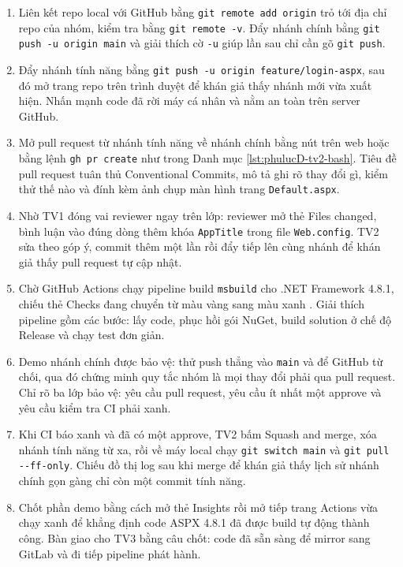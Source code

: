 \begin{enumerate}
\item Liên kết repo local với GitHub bằng \verb|git remote add origin| trỏ tới địa chỉ repo của nhóm, kiểm tra bằng \verb|git remote -v|.
Đẩy nhánh chính bằng \verb|git push -u origin main| và giải thích cờ \verb|-u| giúp lần sau chỉ cần gõ \verb|git push|.
\item Đẩy nhánh tính năng bằng \verb|git push -u origin feature/login-aspx|, sau đó mở trang repo trên trình duyệt để khán giả thấy nhánh mới vừa xuất hiện.
Nhấn mạnh code đã rời máy cá nhân và nằm an toàn trên server GitHub.
\item Mở pull request từ nhánh tính năng về nhánh chính bằng nút trên web hoặc bằng lệnh \verb|gh pr create| như trong Danh mục \ref{lst:phulucD-tv2-bash}.
Tiêu đề pull request tuân thủ Conventional Commits, mô tả ghi rõ thay đổi gì, kiểm thử thế nào và đính kèm ảnh chụp màn hình trang \verb|Default.aspx|.
\item Nhờ TV1 đóng vai reviewer ngay trên lớp: reviewer mở thẻ Files changed, bình luận vào đúng dòng thêm khóa \verb|AppTitle| trong file \verb|Web.config|.
TV2 sửa theo góp ý, commit thêm một lần rồi đẩy tiếp lên cùng nhánh để khán giả thấy pull request tự cập nhật.
\item Chờ GitHub Actions chạy pipeline build \verb|msbuild| cho .NET Framework 4.8.1, chiếu thẻ Checks đang chuyển từ màu vàng sang màu xanh \cite{ghactions,msmsbuild}.
Giải thích pipeline gồm các bước: lấy code, phục hồi gói NuGet, build solution ở chế độ Release và chạy test đơn giản.
\item Demo nhánh chính được bảo vệ: thử push thẳng vào \verb|main| và để GitHub từ chối, qua đó chứng minh quy tắc nhóm là mọi thay đổi phải qua pull request.
Chỉ rõ ba lớp bảo vệ: yêu cầu pull request, yêu cầu ít nhất một approve và yêu cầu kiểm tra CI phải xanh.
\item Khi CI báo xanh và đã có một approve, TV2 bấm Squash and merge, xóa nhánh tính năng từ xa, rồi về máy local chạy \verb|git switch main| và \verb|git pull --ff-only|.
Chiếu đồ thị log sau khi merge để khán giả thấy lịch sử nhánh chính gọn gàng chỉ còn một commit tính năng.
\item Chốt phần demo bằng cách mở thẻ Insights rồi mở tiếp trang Actions vừa chạy xanh để khẳng định code ASPX 4.8.1 đã được build tự động thành công.
Bàn giao cho TV3 bằng câu chốt: code đã sẵn sàng để mirror sang GitLab và đi tiếp pipeline phát hành.
\end{enumerate}

